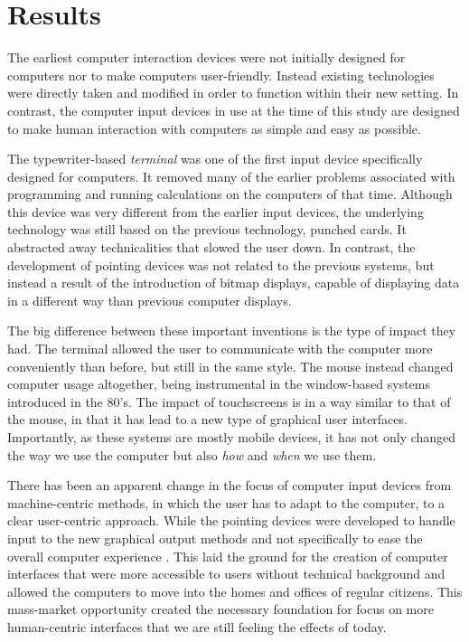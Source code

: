 \section{Results}

The earliest computer interaction devices were not initially designed for computers nor to make computers user-friendly. Instead existing technologies were directly taken and modified in order to function within their new setting. In contrast, the computer input devices in use at the time of this study are designed to make human interaction with computers as simple and easy as possible.

The typewriter-based \emph{terminal} was one of the first input device specifically designed for computers. It removed many of the earlier problems associated with programming and running calculations on the computers of that time. Although this device was very different from the earlier input devices, the underlying technology was still based on the previous technology, punched cards. It abstracted away technicalities that slowed the user down. In contrast, the development of pointing devices was not related to the previous systems, but instead a result of the introduction of bitmap displays, capable of displaying data in a different way than previous computer displays.

The big difference between these important inventions is the type of impact they had. The terminal allowed the user to communicate with the computer more conveniently than before, but still in the same style. The mouse instead changed computer usage altogether, being instrumental in the window-based systems introduced in the 80's. The impact of touchscreens is in a way similar to that of the mouse, in that it has lead to a new type of graphical user interfaces. Importantly, as these systems are mostly mobile devices, it has not only changed the way we use the computer but also \emph{how} and \emph{when} we use them.

There has been an apparent change in the focus of computer input devices from machine-centric methods, in which the user has to adapt to the computer, to a clear user-centric approach. While the pointing devices were developed to handle input to the new graphical output methods and not specifically to ease the overall computer experience . This laid the ground for the creation of computer interfaces that were more accessible to users without technical background and allowed the computers to move into the homes and offices of regular citizens. This mass-market opportunity created the necessary foundation for focus on more human-centric interfaces that we are still feeling the effects of today.

